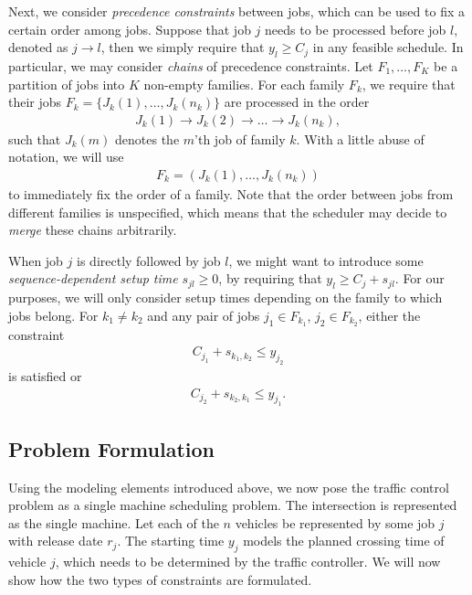 \documentclass{article}
\theoremstyle{definition}
\theoremstyle{plain}
\begin{document}
Next, we consider \textit{precedence constraints} between jobs, which can be
used to fix a certain order among jobs. Suppose that job $j$ needs to be
processed before job $l$, denoted as $j \rightarrow{} l$, then we simply require
that $y_{l} \geq C_{j}$ in any feasible schedule. In particular, we may consider
\textit{chains} of precedence constraints. Let $F_{1}, \dots, F_{K}$ be a
partition of jobs into $K$ non-empty families. For each family $F_{k}$, we
require that their jobs $F_{k} = \{ J_{k}(1), \dots, J_{k}(n_{k})\}$ are
processed in the order
\begin{align*}
J_{k}(1) \rightarrow{} J_{k}(2) \rightarrow{} \dots \rightarrow{} J_{k}(n_{k}) ,
\end{align*}
such that $J_{k}(m)$ denotes the $m$'th job of family $k$. With a little abuse
of notation, we will use
\begin{align*}
  F_{k} = (J_{k}(1), \dots, J_{k}(n_{k}))
\end{align*}
to immediately fix the order of a family. Note that the order between jobs from
different families is unspecified, which means that the scheduler may decide to
\textit{merge} these chains arbitrarily.

When job $j$ is directly followed by job $l$, we might want to introduce some
\textit{sequence-dependent setup time} $s_{jl} \geq 0$, by requiring that
$y_{l} \geq C_{j} + s_{jl}$. For our purposes, we will only consider setup times
depending on the family to which jobs belong. For $k_{1} \neq k_{2}$ and any pair
of jobs $j_{1} \in F_{k_{1}}$, $j_{2} \in F_{k_{2}}$, either the constraint
\begin{align*}
C_{j_{1}} + s_{k_{1},k_{2}} \leq y_{j_{2}}
\end{align*}
is satisfied or
\begin{align*}
C_{j_{2}} + s_{k_{2},k_{1}} \leq y_{j_{1}}.
\end{align*}


\subsection{Problem Formulation}

Using the modeling elements introduced above, we now pose the traffic control
problem as a single machine scheduling problem. The intersection is represented
as the single machine. Let each of the $n$ vehicles be represented by some job
$j$ with release date $r_{j}$. The starting time $y_{j}$ models the planned
crossing time of vehicle $j$, which needs to be determined by the traffic
controller. We will now show how the two types of constraints are formulated.
\end{document}
